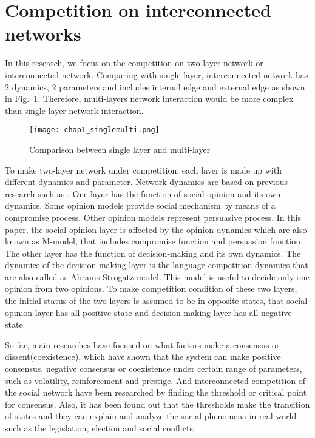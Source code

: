 \section{Competition on interconnected networks}
In this research, we focus on the competition on two-layer network or interconnected network. Comparing with single layer, interconnected network has $2$ dynamics, $2$ parameters and includes internal edge and external edge as shown in Fig.~\ref{chap1_singlemulti}. Therefore, multi-layers network interaction would be more complex than single layer network interaction.
\begin{figure}[!htb]
	\centering
	\texttt{[image: chap1\_singlemulti.png]}
	\caption{Comparison between single layer and multi-layer}
	\label{chap1_singlemulti}
\end{figure}

To make two-layer network under competition, each layer is made up with different dynamics and parameter. Network dynamics are based on previous research such as \parencite{alvarez2016}. One layer has the function of social opinion and its own dynamics. Some opinion models provide social mechanism by means of a compromise process.\parencite{naim2003} Other opinion models represent persuasive process.\parencite{chau2014} In this paper, the social opinion layer is affected by the opinion dynamics which are also known as M-model\parencite{rocca2014}, that includes compromise function and persuasion function. The other layer has the function of decision-making and its own dynamics. The dynamics of the decision making layer is the language competition dynamics that are also called as Abrams-Strogatz model\parencite{abrams2003, vazquez2010, patriarca2012}. This model is useful to decide only one opinion from two opinions. To make competition condition of these two layers, the initial status of the two layers is assumed to be in opposite states, that social opinion layer has all positive state and decision making layer has all negative state.

So far, main researches have focused on what factors make a consensus or dissent(coexistence), which have shown that the system can make positive consensus, negative consensus or coexistence under certain range of parameters, such as volatility, reinforcement and prestige.\parencite{alvarez2016} And interconnected competition of the social network have been researched by finding the threshold or critical point for consensus.\parencite{alvarez2016, gomez2015, diep2017} Also, it has been found out that the thresholds make the transition of states and they can explain and analyze the social phenomena in real world such as the legislation, election and social conflicts.\parencite{alvarez2016, amato2017, diep2017}


